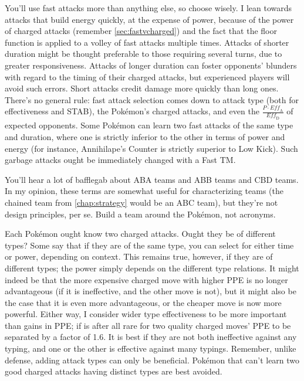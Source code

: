 You'll use fast attacks more than anything else, so choose wisely.
I lean towards attacks that build energy quickly, at the expense of power,
 because of the power of charged attacks (remember \autoref{sec:fastvcharged})
 and the fact that the floor function is applied to a volley of fast attacks multiple times.
Attacks of shorter duration might be thought preferable to those requiring
  several turns, due to greater responsiveness.
Attacks of longer duration can foster opponents' blunders with regard to the
  timing of their charged attacks, but experienced players will avoid such errors.
Short attacks credit damage more quickly than long ones.
There's no general rule: fast attack selection comes down to attack type
  (both for effectiveness and STAB), the Pokémon's charged attacks,
  and even the $\frac{P \cdot \mathit{Eff_\mathrm{A}}}{\mathit{Eff_\mathrm{D}}}$ of expected opponents.
Some Pokémon can learn two fast attacks of the same type and duration,
  where one is strictly inferior to the other in terms of power and energy
  (for instance, Annihilape's Counter is strictly superior to Low Kick).
Such garbage attacks ought be immediately changed with a Fast TM\@.

\begin{tipbox}[title=Dubwool+Wooloo+Mareep is a BAA team]
You'll hear a lot of bafflegab about ABA teams and ABB teams and CBD teams.
  In my opinion, these terms are somewhat useful for characterizing teams
  (the chained team from \autoref{chap:strategy} would be an ABC team),
  but they're not design principles, per se.
Build a team around the Pokémon, not acronyms.
\end{tipbox}

Each Pokémon ought know two charged attacks.
Ought they be of different types?
Some say that if they are of the same type, you can select for either time or power, depending on context.
This remains true, however, if they are of different types; the power simply depends on
  the different type relations.
It might indeed be that the more expensive charged move with higher PPE is no
  longer advantageous (if it is ineffective, and the other move is not),
  but it might also be the case that it is even more advantageous,
  or the cheaper move is now more powerful.
Either way, I consider wider type effectiveness to be more important than gains in PPE;
  if is after all rare for two quality charged moves' PPE to be separated by a factor of 1.6.
It is best if they are not both ineffective against any typing, and one or the
  other is effective against many typings.
Remember, unlike defense, adding attack types can only be beneficial.
Pokémon that can't learn two good charged attacks having distinct types are best avoided.

